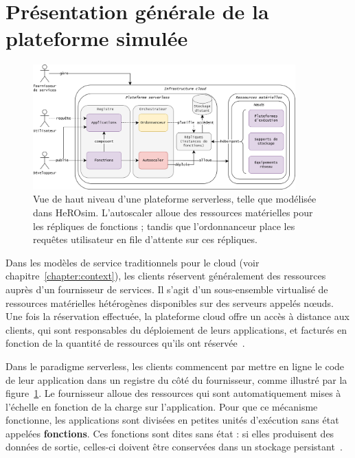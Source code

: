 \section{Présentation générale de la plateforme simulée}
\label{section:herosim-overview}

\begin{figure}[!ht]
    \centering
    \includegraphics[width=0.9\textwidth]{6_Chapitre6/figures/platform-complete.png}
    \caption{Vue de haut niveau d'une plateforme serverless, telle que modélisée dans HeROsim. L'autoscaler alloue des ressources matérielles pour les répliques de fonctions ; tandis que l'ordonnanceur place les requêtes utilisateur en file d'attente sur ces répliques.}
\label{figure:herosim-platform}
\end{figure}

Dans les modèles de service traditionnels pour le cloud (voir chapitre~\ref{chapter:context}), les clients réservent généralement des ressources auprès d'un fournisseur de services. Il s'agit d'un sous-ensemble virtualisé de ressources matérielles hétérogènes disponibles sur des serveurs appelés nœuds. Une fois la réservation effectuée, la plateforme cloud offre un accès à distance aux clients, qui sont responsables du déploiement de leurs applications, et facturés en fonction de la quantité de ressources qu'ils ont réservée~\cite{Lannurien2023}.

Dans le paradigme serverless, les clients commencent par mettre en ligne le code de leur application dans un registre du côté du fournisseur, comme illustré par la figure~\ref{figure:herosim-platform}. Le fournisseur alloue des ressources qui sont automatiquement mises à l'échelle en fonction de la charge sur l'application. Pour que ce mécanisme fonctionne, les applications sont divisées en petites unités d'exécution sans état appelées \textbf{fonctions}. Ces fonctions sont dites sans état : si elles produisent des données de sortie, celles-ci doivent être conservées dans un stockage persistant~\cite{yuFollowingDataNot}.

